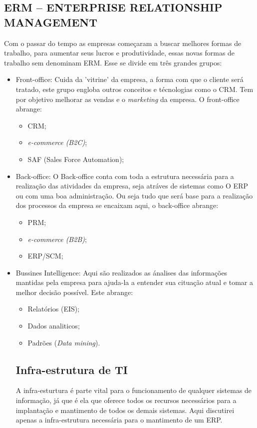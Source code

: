 \documentclass[
	12pt,				%
	openany,			%
	a4paper,			%
	chapter=TITLE,		%
	section=TITLE,		%
	english,
	brazil				%
]{abntex2}
\begin{document}
\begin{itemize}
\begin{itemize}
	\subsection{ERM – ENTERPRISE RELATIONSHIP MANAGEMENT}
	Com o passar do tempo as empresas começaram a buscar melhores formas de trabalho, para aumentar seus lucros e produtividade, essas novas formas de trabalho sem denominam ERM.
	Esse se divide em três grandes grupos:
	\begin{itemize}
		\item Front-office: Cuida da 'vitrine' da empresa, a forma com que o cliente será tratado, este grupo engloba outros conceitos e técnologias como o CRM. Tem por objetivo melhorar as vendas e o \textit{marketing} da empresa. O front-office abrange:
			\begin{itemize}
				\item CRM;
				\item \textit{e-commerce (B2C)};
				\item SAF (Sales Force Automation);	
			\end{itemize}
		\item Back-office: O Back-office conta com toda a estrutura necessária para a realização das atividades da empresa, seja atráves de sistemas como O ERP ou com uma boa administração. Ou seja tudo que será base para a realização dos processos da empresa se encaixam aqui, o back-office abrange:
			\begin{itemize}
				\item PRM;
				\item \textit{e-commerce (B2B)};
				\item ERP/SCM;
			\end{itemize}
		\item Bussines Intelligence: Aqui são realizados as ánalises das informações mantidas pela empresa para ajuda-la a entender sua cituação atual e tomar a melhor decisão possível. Este abrange:
			\begin{itemize} 
			\item Relatórios (EIS);
			\item Dados analiticos;
			\item Padrões (\textit{Data mining}).
	\end{itemize}

	\subsection{Infra-estrutura de TI}

	A infra-esturtura é parte vital para o funcionamento de qualquer sistemas de informação, já que é ela que oferece todos os recursos necessários para a implantação e mantimento de todos os demais sistemas. Aqui discutirei apenas a infra-estrutura necessária para o mantimento de um ERP.


\end{itemize}
\end{itemize}
\end{itemize}
\end{document}

